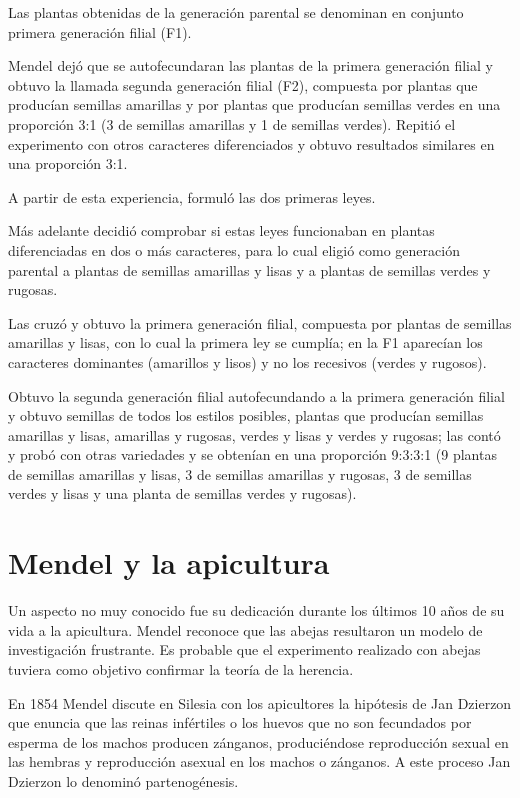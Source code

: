 \documentclass{report}
\begin{document}
Las plantas obtenidas de la generación parental se denominan en conjunto primera generación filial (F1).

Mendel dejó que se autofecundaran las plantas de la primera generación filial y obtuvo la llamada segunda generación filial (F2), compuesta por plantas que producían semillas amarillas y por plantas que producían semillas verdes en una proporción 3:1 (3 de semillas amarillas y 1 de semillas verdes). Repitió el experimento con otros caracteres diferenciados y obtuvo resultados similares en una proporción 3:1.

A partir de esta experiencia, formuló las dos primeras leyes.

Más adelante decidió comprobar si estas leyes funcionaban en plantas diferenciadas en dos o más caracteres, para lo cual eligió como generación parental a plantas de semillas amarillas y lisas y a plantas de semillas verdes y rugosas.

Las cruzó y obtuvo la primera generación filial, compuesta por plantas de semillas amarillas y lisas, con lo cual la primera ley se cumplía; en la F1 aparecían los caracteres dominantes (amarillos y lisos) y no los recesivos (verdes y rugosos).

Obtuvo la segunda generación filial autofecundando a la primera generación filial y obtuvo semillas de todos los estilos posibles, plantas que producían semillas amarillas y lisas, amarillas y rugosas, verdes y lisas y verdes y rugosas; las contó y probó con otras variedades y se obtenían en una proporción 9:3:3:1 (9 plantas de semillas amarillas y lisas, 3 de semillas amarillas y rugosas, 3 de semillas verdes y lisas y una planta de semillas verdes y rugosas).

\chapter{Mendel y la apicultura}
Un aspecto no muy conocido fue su dedicación durante los últimos 10 años de su vida a la apicultura. Mendel reconoce que las abejas resultaron un modelo de investigación frustrante. Es probable que el experimento realizado con abejas tuviera como objetivo confirmar la teoría de la herencia.

En 1854 Mendel discute en Silesia con los apicultores la hipótesis de Jan Dzierzon que enuncia que las reinas infértiles o los huevos que no son fecundados por esperma de los machos producen zánganos, produciéndose reproducción sexual en las hembras y reproducción asexual en los machos o zánganos. A este proceso Jan Dzierzon lo denominó partenogénesis.
\end{document}
